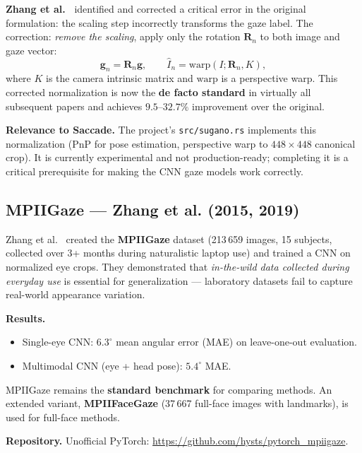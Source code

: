 \documentclass[11pt,a4paper]{article}
\begin{document}
\textbf{Zhang et al.~\cite{zhang2018revisiting}} identified and corrected a critical error in the original formulation:
the scaling step incorrectly transforms the gaze label.
The correction: \textit{remove the scaling}, apply only the rotation $\mathbf{R}_n$ to both image and gaze vector:
\begin{equation}
  \mathbf{g}_n = \mathbf{R}_n \mathbf{g}, \quad \quad \hat{I}_n = \text{warp}(I; \mathbf{R}_n, K),
\end{equation}
where $K$ is the camera intrinsic matrix and $\text{warp}$ is a perspective warp.
This corrected normalization is now the \textbf{de facto standard} in virtually all subsequent papers and achieves $9.5$--$32.7\%$ improvement over the original.

\textbf{Relevance to Saccade.} The project's \texttt{src/sugano.rs} implements this normalization (PnP for pose estimation, perspective warp to $448\times448$ canonical crop). It is currently experimental and not production-ready; completing it is a critical prerequisite for making the CNN gaze models work correctly.

\subsection{MPIIGaze --- Zhang et al. (2015, 2019)}

Zhang et al.~\cite{zhang2015appearance,zhang2019mpiigaze} created the \textbf{MPIIGaze} dataset (213\,659 images, 15 subjects, collected over 3+ months during naturalistic laptop use) and trained a CNN on normalized eye crops.
They demonstrated that \textit{in-the-wild data collected during everyday use} is essential for generalization --- laboratory datasets fail to capture real-world appearance variation.

\textbf{Results.}
\begin{itemize}
  \item Single-eye CNN: $6.3^\circ$ mean angular error (MAE) on leave-one-out evaluation.
  \item Multimodal CNN (eye + head pose): $5.4^\circ$ MAE.
\end{itemize}

MPIIGaze remains the \textbf{standard benchmark} for comparing methods.
An extended variant, \textbf{MPIIFaceGaze} (37\,667 full-face images with landmarks), is used for full-face methods.

\textbf{Repository.} Unofficial PyTorch: \url{https://github.com/hysts/pytorch_mpiigaze}.
\end{document}
